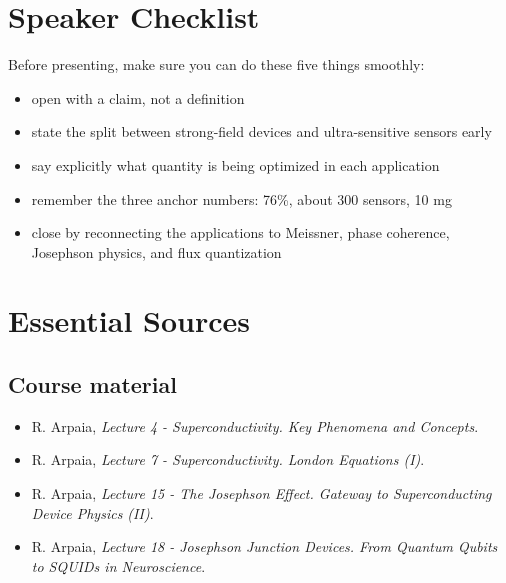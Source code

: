 \documentclass[11pt,a4paper]{article}
\begin{document}
\section{Speaker Checklist}

Before presenting, make sure you can do these five things smoothly:

\begin{itemize}
  \item open with a claim, not a definition
  \item state the split between strong-field devices and ultra-sensitive sensors early
  \item say explicitly what quantity is being optimized in each application
  \item remember the three anchor numbers: 76\%, about 300 sensors, 10 mg
  \item close by reconnecting the applications to Meissner, phase coherence, Josephson physics, and flux quantization
\end{itemize}

\section{Essential Sources}

\subsection{Course material}
\begin{itemize}
  \item R. Arpaia, \textit{Lecture 4 - Superconductivity. Key Phenomena and Concepts}.
  \item R. Arpaia, \textit{Lecture 7 - Superconductivity. London Equations (I)}.
  \item R. Arpaia, \textit{Lecture 15 - The Josephson Effect. Gateway to Superconducting Device Physics (II)}.
  \item R. Arpaia, \textit{Lecture 18 - Josephson Junction Devices. From Quantum Qubits to SQUIDs in Neuroscience}.
\end{itemize}
\end{document}
